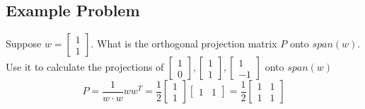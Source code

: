 \begin{enumerate}
\subsection{Example Problem}
Suppose $w = \begin{bmatrix} 1 \\ 1 \end{bmatrix}$. What is the 
orthogonal projection matrix $P$ onto $span(w)$. Use it to calculate 
the projections of $\begin{bmatrix} 1 \\ 0 \end{bmatrix}, 
\begin{bmatrix} 1 \\ 1 \end{bmatrix}, \begin{bmatrix} 1 \\ -1 
  \end{bmatrix}$ onto $span(w)$
\[
  P = \frac{1}{w \cdot w}ww^T = \frac{1}{2} \begin{bmatrix} 1 \\ 1 
    \end{bmatrix} \begin{bmatrix} 1 & 1 \end{bmatrix} = 
    \frac{1}{2} \begin{bmatrix} 1 & 1 \\ 1 & 1 \end{bmatrix}
\]
\end{enumerate}
